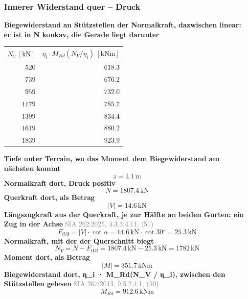 \documentclass[11pt,a4paper]{article}
\newcommand{\normref}[1]{{\small\textcolor{gray}{#1}}}
\begin{document}
\subsubsection{Innerer Widerstand quer – Druck}
\noindent\textbf{Biegewiderstand an Stützstellen der Normalkraft, dazwischen linear: er ist in N konkav, die Gerade liegt darunter}
\begin{longtable}{rr}
\hline
$N_V\ [\mathrm{kN}]$ & $\eta_i \cdot M_{Rd}(N_V / \eta_i)\ [\mathrm{kNm}]$ \\
\hline
\endhead
$520$ & $618.3$ \\
$739$ & $676.2$ \\
$959$ & $732.0$ \\
$1179$ & $785.7$ \\
$1399$ & $834.4$ \\
$1619$ & $880.2$ \\
$1839$ & $923.9$ \\
\hline
\end{longtable}
\noindent\textbf{Tiefe unter Terrain, wo das Moment dem Biegewiderstand am nächsten kommt}
\begin{equation*}
z = 4.1\,\mathrm{m}
\end{equation*}
\noindent\textbf{Normalkraft dort, Druck positiv}
\begin{equation*}
N = 1807.4\,\mathrm{kN}
\end{equation*}
\noindent\textbf{Querkraft dort, als Betrag}
\begin{equation*}
\left|V\right| = 14.6\,\mathrm{kN}
\end{equation*}
\noindent\textbf{Längszugkraft aus der Querkraft, je zur Hälfte an beiden Gurten: ein Zug in der Achse} \hfill \normref{SIA 262:2025, 4.3.3.4.11, (51)}
\begin{equation*}
F_{tVd} = \left|V\right| \cdot \cot \alpha = 14.6\,\mathrm{kN} \cdot \cot 30{}^{\circ} = 25.3\,\mathrm{kN}
\end{equation*}
\noindent\textbf{Normalkraft, mit der der Querschnitt biegt}
\begin{equation*}
N_V = N - F_{tVd} = 1807.4\,\mathrm{kN} - 25.3\,\mathrm{kN} = 1782\,\mathrm{kN}
\end{equation*}
\noindent\textbf{Moment dort, als Betrag}
\begin{equation*}
\left|M\right| = 351.7\,\mathrm{kNm}
\end{equation*}
\noindent\textbf{Biegewiderstand dort, η\_i · M\_Rd(N\_V / η\_i), zwischen den Stützstellen gelesen} \hfill \normref{SIA 267:2013, 9.5.2.4.1, (50)}
\begin{equation*}
M_{Rd} = 912.6\,\mathrm{kNm}
\end{equation*}
\end{document}
